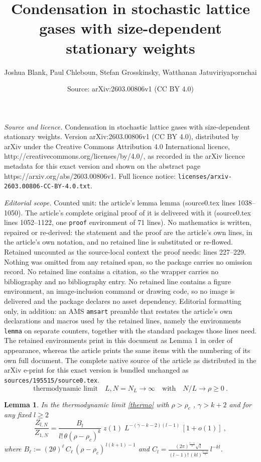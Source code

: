 \documentclass[10pt,a4paper]{amsart}
\title{Condensation in stochastic lattice gases with size-dependent stationary weights}
\author{Joshua Blank, Paul Chleboun, Stefan Grosskinsky, Watthanan Jatuviriyapornchai}
\date{Source: arXiv:2603.00806v1 (CC BY 4.0)}
\newtheorem{lemma}{Lemma}
\begin{document}
\maketitle

\noindent\emph{Source and licence.} Condensation in stochastic lattice gases with size-dependent stationary weights. Version arXiv:2603.00806v1 (CC BY 4.0), distributed by arXiv under the Creative Commons Attribution 4.0 International licence, http://creativecommons.org/licenses/by/4.0/, as recorded in the arXiv licence metadata for this exact version and shown on the abstract page https://arxiv.org/abs/2603.00806v1. Full licence notice: \texttt{licenses/arxiv-2603.00806-CC-BY-4.0.txt}.\par\smallskip

\noindent\textit{Editorial scope.} Counted unit: the article's lemma lemma (source0.tex lines 1038--1050). The article's complete original proof of it is delivered with it (source0.tex lines 1052--1122, one \texttt{proof} environment of 71 lines). No mathematics is written, repaired or re-derived: the statement and the proof are the article's own lines, in the article's own notation, and no retained line is substituted or re-flowed.  Retained uncounted as the source-local context the proof needs: lines 227--229.  Nothing was omitted from any retained span, so the package carries no omission record.  No retained line contains a citation, so the wrapper carries no bibliography and no bibliography entry.  No retained line contains a figure environment, an image-inclusion command or drawing code, so no image is delivered and the package declares no asset dependency.  Editorial formatting only, in addition: an AMS \texttt{amsart} preamble that restates the article's own declarations and macros used by the retained lines, namely the environments \texttt{lemma} on separate counters, together with the standard packages those lines need.  The retained environments print in this document as Lemma 1 in order of appearance, whereas the article prints the same items with the numbering of its own full document.  The complete native source of the article as distributed in the arXiv e-print for this exact version is bundled unchanged as \texttt{sources/195515/source0.tex}.
\begin{equation}\label{thermo}
    \mbox{thermodynamic limit}\quad L,N=N_L \to\infty\quad\mbox{with}\quad N/L\to\rho\geq 0\ .
\end{equation}

\begin{lemma}
    In the thermodynamic limit \eqref{thermo} with $\rho >\rho_c$ , $\gamma >k+2$ and for any fixed $l\geq 2$
    \[
    	\frac{Z_{l,N}}{Z_{1,N}}
		=\frac{B_l}{l!\,\theta(\rho-\rho_c)^{k}}\;z(1)\;
		L^{-(\gamma-k-2)(l-1)}
		\,[1+o(1)] \ ,
    \]
    where $
	B_\ell:=(2\theta)^{\ell}\,C_{\ell}\,(\rho-\rho_c)^{\,l(k+1)-1}$ and
	$C_l=\frac{(2\pi)^{\frac{l-1}{2}}\sqrt{l}}
	{(l-1)!\,(kl)^{\frac{l-1}{2}}}\,l^{-kl}$.
\end{lemma}
\end{document}
